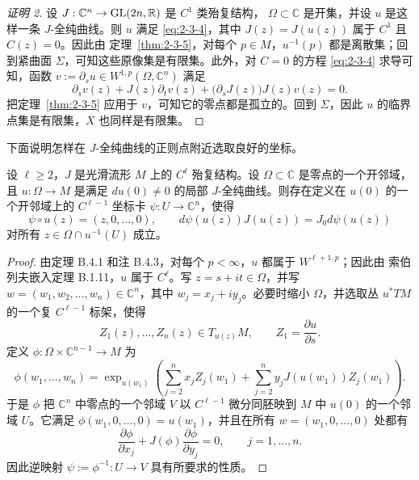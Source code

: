 \begin{proof}[证明 2]
设 $J:\mathbb C^n\to\operatorname{GL}(2n,\mathbb R)$ 是 $C^1$ 类殆复结构，
$\Omega\subset\mathbb C$ 是开集，并设 $u$ 是这样一条 $J$-全纯曲线。则 $u$ 满足
\eqref{eq:2-3-4}，其中 $J(z)=J(u(z))$ 属于 $C^1$ 且 $C(z)=0$。因此由
定理~\ref{thm:2-3-5}，对每个 $p\in M$，$u^{-1}(p)$ 都是离散集；回到紧曲面
$\Sigma$，可知这些原像集是有限集。此外，对
$C=0$ 的方程
\eqref{eq:2-3-4} 求导可知，函数
$v:=\partial_su\in W^{1,p}(\Omega,\mathbb C^n)$ 满足
\[
  \partial_sv(z)+J(z)\partial_tv(z)
  +\bigl(\partial_sJ(z)\bigr)J(z)v(z)=0.
\]
把定理~\ref{thm:2-3-5} 应用于 $v$，可知它的零点都是孤立的。回到 $\Sigma$，因此
$u$ 的临界点集是有限集，$X$ 也同样是有限集。
\end{proof}

下面说明怎样在 $J$-全纯曲线的正则点附近选取良好的坐标。

\begin{lemma}\label{lem:2-4-2}
设 $\ell\ge2$，$J$ 是光滑流形 $M$ 上的 $C^\ell$ 殆复结构。设
$\Omega\subset\mathbb C$ 是零点的一个开邻域，且
$u:\Omega\to M$ 是满足 $du(0)\ne0$ 的局部 $J$-全纯曲线。则存在定义在 $u(0)$
的一个开邻域上的 $C^{\ell-1}$ 坐标卡 $\psi:U\to\mathbb C^n$，使得
\[
  \psi\circ u(z)=(z,0,\ldots,0),\qquad
  d\psi(u(z))J(u(z))=J_0d\psi(u(z))
\]
对所有 $z\in\Omega\cap u^{-1}(U)$ 成立。
\end{lemma}

\begin{proof}
由定理 B.4.1 和注 B.4.3，对每个 $p<\infty$，$u$ 都属于 $W^{\ell+1,p}$；因此由
索伯列夫嵌入定理 B.1.11，$u$ 属于 $C^\ell$。写
$z=s+it\in\Omega$，并写
$w=(w_1,w_2,\ldots,w_n)\in\mathbb C^n$，其中 $w_j=x_j+iy_j$。必要时缩小
$\Omega$，并选取丛 $u^*TM$ 的一个复 $C^{\ell-1}$ 标架，使得
\[
  Z_1(z),\ldots,Z_n(z)\in T_{u(z)}M,\qquad
  Z_1=\frac{\partial u}{\partial s}.
\]
定义 $\phi:\Omega\times\mathbb C^{n-1}\to M$ 为
\[
  \phi(w_1,\ldots,w_n)
  =\exp_{u(w_1)}\left(
    \sum_{j=2}^n x_jZ_j(w_1)
    +\sum_{j=2}^n y_jJ(u(w_1))Z_j(w_1)
  \right).
\]
于是 $\phi$ 把 $\mathbb C^n$ 中零点的一个邻域 $V$ 以 $C^{\ell-1}$ 微分同胚映到
$M$ 中 $u(0)$ 的一个邻域 $U$。它满足
$\phi(w_1,0,\ldots,0)=u(w_1)$，并且在所有
$w=(w_1,0,\ldots,0)$ 处都有
\[
  \frac{\partial\phi}{\partial x_j}
  +J(\phi)\frac{\partial\phi}{\partial y_j}=0,
  \qquad j=1,\ldots,n.
\]
因此逆映射 $\psi:=\phi^{-1}:U\to V$ 具有所要求的性质。
\end{proof}

